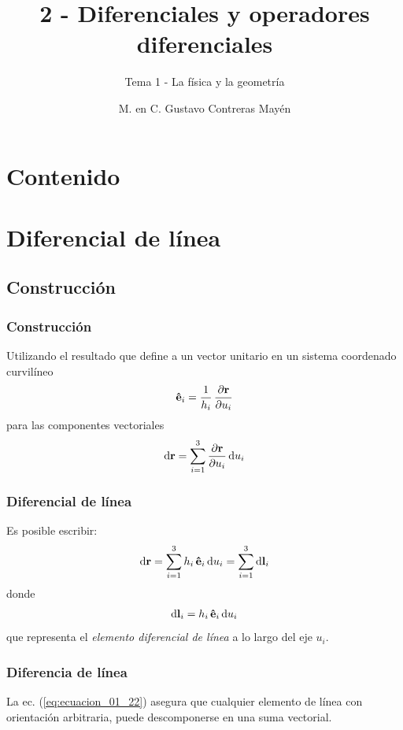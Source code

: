\documentclass[12pt]{beamer}
\title{\large{2 - Diferenciales y operadores diferenciales}}
\subtitle{Tema 1 - La física y la geometría}
\author{M. en C. Gustavo Contreras Mayén}
\date{}
\institute{Facultad de Ciencias - UNAM}
\begin{document}
\maketitle
\fontsize{14}{14}\selectfont
{}
\section*{Contenido}
\section{Diferencial de línea}
\subsection{Construcción}
\begin{frame}
\frametitle{Construcción}
Utilizando el resultado que define a un vector unitario en un sistema coordenado curvilíneo
\begin{align*}
\vu{e}_{i} = \dfrac{1}{h_{i}} \, \pdv{\vb{r}}{u_{i}}
\end{align*}
para las componentes vectoriales
\begin{align*}
\dd{\vb{r}} = \sum_{i=1}^{3} \pdv{\vb{r}}{u_{i}} \dd{u_{i}}
\end{align*}
\end{frame}
\begin{frame}
\frametitle{Diferencial de línea}
Es posible escribir:
\begin{align}
\dd{\vb{r}} = \sum_{i=1}^{3} h_{i} \, \vu{e}_{i} \dd{u_{i}} = \sum_{i=1}^{3} \dd{\vb{l}_{i}}
\label{eq:ecuacion_01_21}
\end{align}
\pause
donde
\begin{align}
\dd{\vb{l}_{i}} = h_{i} \, \vu{e}_{i} \dd{u_{i}}
\label{eq:ecuacion_01_22}
\end{align}
que representa el \emph{elemento diferencial de línea} a lo largo del eje $u_{i}$.
\end{frame}
\begin{frame}
\frametitle{Diferencia de línea}
La ec. (\ref{eq:ecuacion_01_22}) asegura que cualquier elemento de línea con orientación arbitraria, puede descomponerse en una suma vectorial.
\end{frame}
\end{document}
